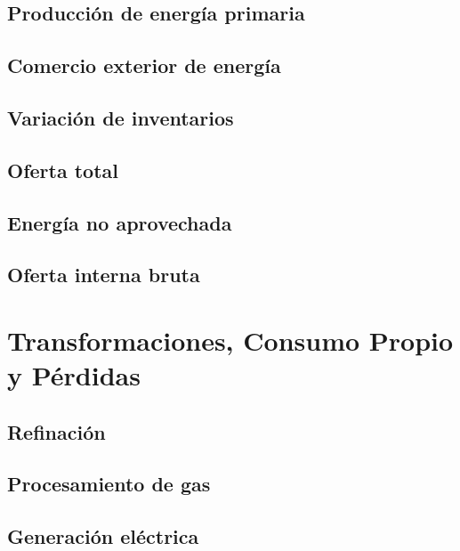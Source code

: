 \documentclass{sener2025}
\begin{document}
\subsection{Producción de energía primaria}




\subsection{Comercio exterior de energía}




\subsection{Variación de inventarios}




\subsection{Oferta total}




\subsection{Energía no aprovechada}




\subsection{Oferta interna bruta}





\section{Transformaciones, Consumo Propio y Pérdidas}




\subsection{Refinación}




\subsection{Procesamiento de gas}




\subsection{Generación eléctrica}
\end{document}
